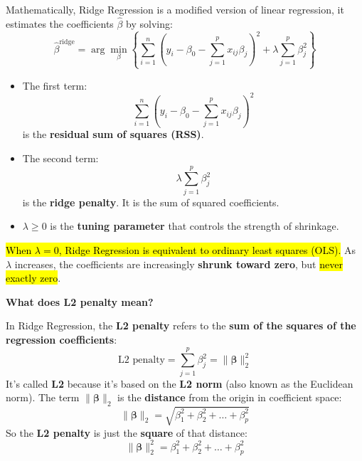 \highspace
Mathematically, Ridge Regression is a modified version of linear regression, it estimates the coefficients $\hat{\beta}$ by solving:
\begin{equation}
    \hat{\beta}^{\text{ridge}} = \arg\min_{\beta} \left\{ \sum_{i=1}^n (y_i - \beta_0 - \sum_{j=1}^p x_{ij} \beta_j)^2 + \lambda \sum_{j=1}^p \beta_j^2 \right\}
\end{equation}
\begin{itemize}
    \item The first term:
    \begin{equation*}
        \sum_{i=1}^n (y_i - \beta_0 - \sum_{j=1}^p x_{ij} \beta_j)^2
    \end{equation*}
    is the \textbf{residual sum of squares (RSS)}.
    \item The second term:
    \begin{equation*}
        \lambda \sum_{j=1}^p \beta_j^2
    \end{equation*}
    is the \textbf{ridge penalty}. It is the sum of squared coefficients.
    \item $\lambda \geq 0$ is the \textbf{tuning parameter} that controls the strength of shrinkage.
\end{itemize}
\hl{When $\lambda = 0$, Ridge Regression is equivalent to ordinary least squares (OLS).} As $\lambda$ increases, the coefficients are increasingly \textbf{shrunk toward zero}, but \hl{never exactly zero}.

\highspace
\begin{flushleft}
    \textcolor{Green3}{ \textbf{What does L2 penalty mean?}}
\end{flushleft}
In Ridge Regression, the \textbf{L2 penalty} refers to the \textbf{sum of the squares of the regression coefficients}:
\begin{equation}
    \text{L2 penalty} = \sum_{j=1}^{p} \beta_j^2 = \| \boldsymbol{\beta} \|_2^2
\end{equation}
It's called \textbf{L2} because it's based on the \textbf{L2 norm} (also known as the Euclidean norm). The term $\| \boldsymbol{\beta} \|_2$ is the \textbf{distance} from the origin in coefficient space:
\begin{equation*}
    \| \boldsymbol{\beta} \|_2 = \sqrt{ \beta_1^2 + \beta_2^2 + \dots + \beta_p^2 }
\end{equation*}
So the \textbf{L2 penalty} is just the \textbf{square} of that distance:
\begin{equation*}
    \| \boldsymbol{\beta} \|_2^2 = \beta_1^2 + \beta_2^2 + \dots + \beta_p^2
\end{equation*}

